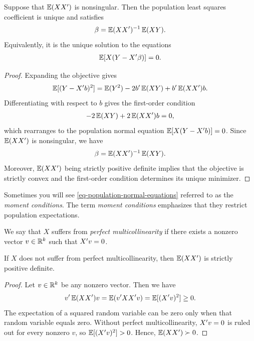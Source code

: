 \documentclass[a4paper,12pt]{article}
\begin{document}
\begin{theorem}\label{thm-population-least-squares}
	Suppose that $\operatorname{\mathbb{E}}(XX^{\prime})$ is nonsingular.
	Then the population least squares coefficient is unique and satisfies
	\begin{align}\label{eq-population-least-squares}
		\beta=\operatorname{\mathbb{E}}(XX^{\prime})^{-1}\operatorname{\mathbb{E}}(XY).
	\end{align}
	Equivalently, it is the unique solution to the equations
	\begin{align}\label{eq-population-normal-equations}
		\operatorname{\mathbb{E}}[X(Y-X^{\prime}\beta)]=0.
	\end{align}
\end{theorem}
\begin{proof}
	Expanding the objective gives
	\begin{align*}
		\operatorname{\mathbb{E}}[(Y-X^{\prime} b)^2]=\operatorname{\mathbb{E}}(Y^2)-2b^{\prime}\operatorname{\mathbb{E}}(XY)+b^{\prime}\operatorname{\mathbb{E}}(XX^{\prime})b.
	\end{align*}
	Differentiating with respect to $b$ gives the first-order condition
	\begin{align}
		-2\operatorname{\mathbb{E}}(XY)+2\operatorname{\mathbb{E}}(XX^{\prime})b=0,
	\end{align}
	which rearranges to the population normal equation $\operatorname{\mathbb{E}}[X(Y-X^{\prime} b)]=0$.
	Since $\operatorname{\mathbb{E}}(XX^{\prime})$ is nonsingular, we have
	\begin{align}
		\beta = \operatorname{\mathbb{E}}(XX^{\prime})^{-1}\operatorname{\mathbb{E}}(XY).
	\end{align}
	Moreover, $\operatorname{\mathbb{E}}(XX^{\prime})$ being strictly positive definite implies that the objective is strictly convex
	and the first-order condition determines its unique minimizer.
\end{proof}

\begin{remark}
	Sometimes you will see \eqref{eq-population-normal-equations} referred to as the \emph{moment conditions}.
	The term \emph{moment conditions} emphasizes that they restrict population expectations.
\end{remark}

\begin{definition}\label{def-multicollinearity}
	We say that $X$ suffers from \emph{perfect multicollinearity} if
	there exists a nonzero vector $v\in\mathbb{R}^k$ such that $X^{\prime} v=0$.
\end{definition}

\begin{lemma}\label{lem-multicollinearity-positive-definite}
	If $X$ does not suffer from perfect multicollinearity, then $\operatorname{\mathbb{E}}(XX^{\prime})$ is strictly positive definite.
\end{lemma}
\begin{proof}
	Let $v\in\mathbb{R}^k$ be any nonzero vector.
	Then we have
	\begin{align}
		v^{\prime}\operatorname{\mathbb{E}}(XX^{\prime})v=\operatorname{\mathbb{E}}(v^{\prime} XX^{\prime} v)=\operatorname{\mathbb{E}}[(X^{\prime} v)^2]\ge0.
	\end{align}
	The expectation of a squared random variable can be zero only when that random variable equals zero.
	Without perfect multicollinearity, $X^{\prime} v=0$ is ruled out for every nonzero $v$,
	so $\operatorname{\mathbb{E}}[(X^{\prime} v)^2]>0$.
	Hence, $\operatorname{\mathbb{E}}(XX^{\prime})\succ0$.
\end{proof}
\end{document}
